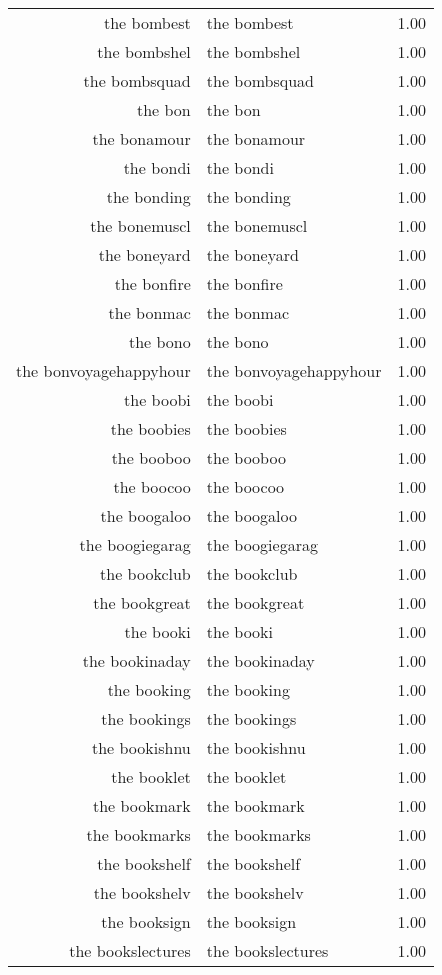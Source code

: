 \begin{table}[ht]
\begin{tabular}{rlr}
  the bombest & the bombest & 1.00 \\ 
  the bombshel & the bombshel & 1.00 \\ 
  the bombsquad & the bombsquad & 1.00 \\ 
  the bon & the bon & 1.00 \\ 
  the bonamour & the bonamour & 1.00 \\ 
  the bondi & the bondi & 1.00 \\ 
  the bonding & the bonding & 1.00 \\ 
  the bonemuscl & the bonemuscl & 1.00 \\ 
  the boneyard & the boneyard & 1.00 \\ 
  the bonfire & the bonfire & 1.00 \\ 
  the bonmac & the bonmac & 1.00 \\ 
  the bono & the bono & 1.00 \\ 
  the bonvoyagehappyhour & the bonvoyagehappyhour & 1.00 \\ 
  the boobi & the boobi & 1.00 \\ 
  the boobies & the boobies & 1.00 \\ 
  the booboo & the booboo & 1.00 \\ 
  the boocoo & the boocoo & 1.00 \\ 
  the boogaloo & the boogaloo & 1.00 \\ 
  the boogiegarag & the boogiegarag & 1.00 \\ 
  the bookclub & the bookclub & 1.00 \\ 
  the bookgreat & the bookgreat & 1.00 \\ 
  the booki & the booki & 1.00 \\ 
  the bookinaday & the bookinaday & 1.00 \\ 
  the booking & the booking & 1.00 \\ 
  the bookings & the bookings & 1.00 \\ 
  the bookishnu & the bookishnu & 1.00 \\ 
  the booklet & the booklet & 1.00 \\ 
  the bookmark & the bookmark & 1.00 \\ 
  the bookmarks & the bookmarks & 1.00 \\ 
  the bookshelf & the bookshelf & 1.00 \\ 
  the bookshelv & the bookshelv & 1.00 \\ 
  the booksign & the booksign & 1.00 \\ 
  the bookslectures & the bookslectures & 1.00 \\ 

\end{tabular}
\end{table}
